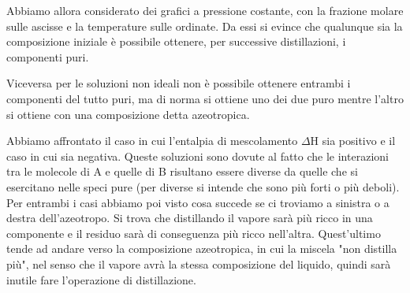 Abbiamo allora considerato dei grafici a pressione costante, con la frazione molare sulle ascisse e la temperature sulle ordinate. Da essi si evince che qualunque sia la composizione iniziale è possibile ottenere, per successive distillazioni, i componenti puri.

Viceversa per le soluzioni non ideali non è possibile ottenere entrambi i componenti del tutto puri, ma di norma si ottiene uno dei due puro mentre l'altro si ottiene con una composizione detta azeotropica.

Abbiamo affrontato il caso in cui l'entalpia di mescolamento $\Delta$H sia positivo e il caso in cui sia negativa. Queste soluzioni sono dovute al fatto che le interazioni tra le molecole di A e quelle di B risultano essere diverse da quelle che si esercitano nelle speci pure (per diverse si intende che sono più forti o più deboli). Per entrambi i casi abbiamo poi visto cosa succede se ci troviamo a sinistra o a destra dell'azeotropo. Si trova che distillando il vapore sarà più ricco in una componente e il residuo sarà di conseguenza più ricco nell'altra. Quest'ultimo tende ad andare verso la composizione azeotropica, in cui la miscela "non distilla più", nel senso che il vapore avrà la stessa composizione del liquido, quindi sarà inutile fare l'operazione di distillazione.